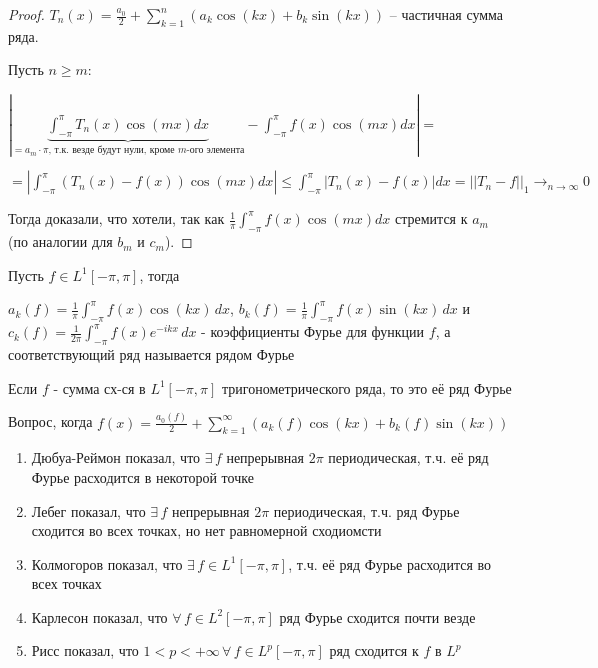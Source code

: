 \begin{proof}

    $T_n (x) = \frac{a_0}{2} + \sum_{k = 1}^n (a_k \cos (kx) + b_k \sin (kx))$ -- частичная сумма ряда.

    Пусть $n \geq m$:

    $|\underbrace{\int_{-\pi}^{\pi} T_n(x) \cos{(m x)} dx}_{= a_m \cdot \pi \text{, т.к. везде будут нули, кроме $m$-ого элемента}} - \int_{-\pi}^{\pi} f(x) \cos{(m x)} dx| =$

    $= |\int_{-\pi}^{\pi} \left(T_n(x) - f(x)\right) \cos{(m x)} dx | \leq \int_{-\pi}^{\pi} |T_n(x) - f(x)| dx = || T_n - f ||_1 \to_{n \to \infty} 0$

    Тогда доказали, что хотели, так как $\frac{1}{\pi} \int_{-\pi}^{\pi} f(x) \cos{(mx)} dx$ стремится к $a_m$ (по аналогии для $b_m$ и $c_m$).


\end{proof}

\begin{definition}
    Пусть $f \in L^1 [-\pi, \pi]$, тогда

    $a_k (f) = \frac{1}{\pi} \int_{-\pi}^\pi f(x) \cos (kx) \, dx$, $b_k (f) = \frac{1}{\pi} \int_{-\pi}^\pi f(x) \sin (kx) \, dx$ и
    $c_k(f) = \frac{1}{2\pi} \int_{-\pi}^\pi f(x) e^{-ikx} \, dx$ - коэффициенты Фурье для функции $f$, а соответствующий ряд называется рядом Фурье
\end{definition}

\begin{remark}
    Если $f$ - сумма сх-ся в $L^1 [-\pi, \pi]$ тригонометрического ряда, то это её ряд Фурье

    Вопрос, когда $f (x) = \frac{a_0 (f)}{2} + \sum_{k = 1}^\infty (a_k (f) \cos (kx) + b_k (f) \sin (kx))$

    \begin{enumerate}
        \item {
            Дюбуа-Реймон показал, что $\exists \, f$ непрерывная $2\pi$ периодическая, т.ч. её ряд Фурье расходится в некоторой точке
        }
        \item {
            Лебег показал, что $\exists \, f$ непрерывная $2\pi$ периодическая, т.ч. ряд Фурье сходится во всех точках, но нет равномерной сходиомсти
        }
        \item {
            Колмогоров показал, что $\exists \, f \in L^1 [-\pi, \pi]$, т.ч. её ряд Фурье расходится во всех точках
        }
        \item {
            Карлесон показал, что $\forall \, f \in L^2 [-\pi, \pi]$ ряд Фурье сходится почти везде
        }
        \item {
            Рисс показал, что $1 < p < +\infty \, \forall \, f \in L^p [-\pi, \pi]$ ряд сходится к $f$ в $L^p$
        }
    \end{enumerate}
\end{remark}

